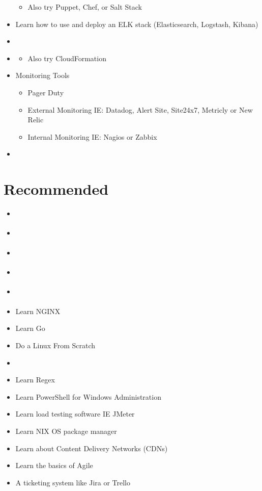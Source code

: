 \documentclass[12pt]{article}
\begin{document}
\begin{itemize}
\begin{itemize}
  \item Also try Puppet, Chef, or Salt Stack
  \end{itemize}
\item Learn how to use and deploy an ELK stack (Elasticsearch, Logstash, Kibana)
\item \autocite{schuh2006softwaresecurity}
\item \autocite{brikman2017terraform}
  \begin{itemize}
  \item Also try CloudFormation
  \end{itemize}
\item Monitoring Tools
  \begin{itemize}
  \item Pager Duty
  \item External Monitoring IE: Datadog, Alert Site, Site24x7, Metricly or New Relic
  \item Internal Monitoring IE: Nagios or Zabbix
  \end{itemize}
\item \autocite{hoffman2016twelvefactor}
\end{itemize}

\section{Recommended}
\begin{itemize}
\item \autocite{mcdowell2015interview}
\item \autocite{spafford2013phoenix}
\item \autocite{skiena2008algorithm}
\item \autocite{gamma1994patterns}
\item \autocite{lammle2016ccna}
\item Learn NGINX
\item Learn Go
\item Do a Linux From Scratch \autocite{beekmanslfs}
\item \autocite{beyer2016sre}
\item Learn Regex
\item Learn PowerShell for Windows Administration
\item Learn load testing software IE JMeter
\item Learn NIX OS package manager
\item Learn about Content Delivery Networks (CDNs)
\item Learn the basics of Agile
\item A ticketing system like Jira or Trello
\end{itemize}
\end{document}
